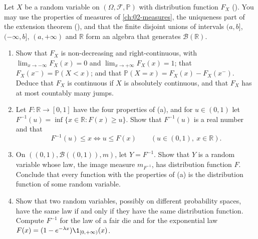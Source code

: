 \begin{exercise}\label{ex:ld-cdf}
\medium Let $X$ be a random variable on $(\Omega,\mathcal F,\mathbb P)$ with distribution function
$F_X$ (). You may use the properties of measures of \cref{ch:02-measures}, the
uniqueness part of the extension theorem (), and that the finite disjoint
unions of intervals $(a,b]$, $(-\infty,b]$, $(a,+\infty)$ and $\mathbb R$ form an algebra that
generates $\mathcal B(\mathbb R)$.
\begin{enumerate}[label=(\alph*)]
  \item Show that $F_X$ is non-decreasing and right-continuous, with $\lim_{x\to-\infty}F_X(x)=0$ and
    $\lim_{x\to+\infty}F_X(x)=1$; that $F_X(x^-)=\mathbb P(X<x)$; and that
    $\mathbb P(X=x)=F_X(x)-F_X(x^-)$. Deduce that $F_X$ is continuous if $X$ is absolutely continuous,
    and that $F_X$ has at most countably many jumps.
  \item Let $F:\mathbb R\to[0,1]$ have the four properties of (a), and for $u\in(0,1)$ let
    $F^{-1}(u)=\inf\{x\in\mathbb R:F(x)\ge u\}$. Show that $F^{-1}(u)$ is a real number and that
    \[
      F^{-1}(u)\le x\iff u\le F(x)\qquad(u\in(0,1),\ x\in\mathbb R).
    \]
  \item On $((0,1),\mathcal B((0,1)),m)$, let $Y=F^{-1}$. Show that $Y$ is a random variable whose
    law, the image measure $m_{F^{-1}}$, has distribution function $F$. Conclude that every
    function with the properties of (a) is the distribution function of some random variable.
  \item Show that two random variables, possibly on different probability spaces, have the same
    law if and only if they have the same distribution function. Compute $F^{-1}$ for the law of a
    fair die and for the exponential law $F(x)=(1-e^{-\lambda x})\1_{[0,+\infty)}(x)$.
\end{enumerate}
\end{exercise}

